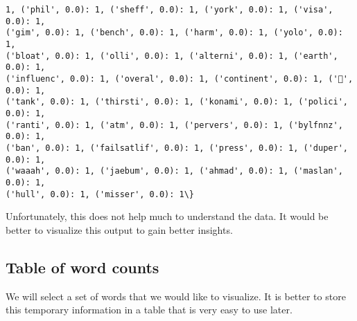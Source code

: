 \documentclass[11pt]{article}
\begin{document}
\begin{Verbatim}[commandchars=\\\{\}]
1, ('phil', 0.0): 1, ('sheff', 0.0): 1, ('york', 0.0): 1, ('visa', 0.0): 1,
('gim', 0.0): 1, ('bench', 0.0): 1, ('harm', 0.0): 1, ('yolo', 0.0): 1,
('bloat', 0.0): 1, ('olli', 0.0): 1, ('alterni', 0.0): 1, ('earth', 0.0): 1,
('influenc', 0.0): 1, ('overal', 0.0): 1, ('continent', 0.0): 1, ('🔫', 0.0): 1,
('tank', 0.0): 1, ('thirsti', 0.0): 1, ('konami', 0.0): 1, ('polici', 0.0): 1,
('ranti', 0.0): 1, ('atm', 0.0): 1, ('pervers', 0.0): 1, ('bylfnnz', 0.0): 1,
('ban', 0.0): 1, ('failsatlif', 0.0): 1, ('press', 0.0): 1, ('duper', 0.0): 1,
('waaah', 0.0): 1, ('jaebum', 0.0): 1, ('ahmad', 0.0): 1, ('maslan', 0.0): 1,
('hull', 0.0): 1, ('misser', 0.0): 1\}
    \end{Verbatim}

    Unfortunately, this does not help much to understand the data. It would
be better to visualize this output to gain better insights.

    \hypertarget{table-of-word-counts}{%
\subsection{Table of word counts}\label{table-of-word-counts}}

    We will select a set of words that we would like to visualize. It is
better to store this temporary information in a table that is very easy
to use later.
\end{document}
